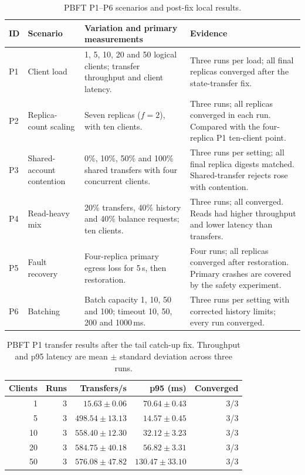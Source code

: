 \documentclass[sigconf,a4paper]{acmart}
\begin{document}
    \begin{table}[t]
        \centering
        \small
        \caption{PBFT P1--P6 scenarios and post-fix local results.}
        \label{tab:pbft-p-scenarios}
        \begin{tabular}{p{0.8cm}p{3.3cm}p{8.4cm}p{3.1cm}}
            \toprule
            \textbf{ID} & \textbf{Scenario} & \textbf{Variation and primary measurements} & \textbf{Evidence} \\
            \midrule
            P1 & Client load & 1, 5, 10, 20 and 50 logical clients; transfer throughput and client latency. & Three runs per load; all final replicas converged after the state-transfer fix. \\
            P2 & Replica-count scaling & Seven replicas ($f=2$), with ten clients. & Three runs; all replicas converged in each run. Compared with the four-replica P1 ten-client point. \\
            P3 & Shared-account contention & 0\%, 10\%, 50\% and 100\% shared transfers with four concurrent clients. & Three runs per setting; all final replica digests matched. Shared-transfer rejects rose with contention. \\
            P4 & Read-heavy mix & 20\% transfers, 40\% history and 40\% balance requests; ten clients. & Three runs; all converged. Reads had higher throughput and lower latency than transfers. \\
            P5 & Fault recovery & Four-replica primary egress loss for 5\,s, then restoration. & Four runs; all replicas converged after restoration. Primary crashes are covered by the safety experiment. \\
            P6 & Batching & Batch capacity 1, 10, 50 and 100; timeout 10, 50, 200 and 1000\,ms. & Three runs per setting with corrected history limits; every run converged. \\
            \bottomrule
        \end{tabular}
    \end{table}

    \begin{table}[t]
        \centering
        \small
        \caption{PBFT P1 transfer results after the tail catch-up fix. Throughput and p95 latency are mean $\pm$ standard deviation across three runs.}
        \label{tab:pbft-p1-load}
        \begin{tabular}{r r r r r}
            \toprule
            \textbf{Clients} & \textbf{Runs} & \textbf{Transfers/s} & \textbf{p95 (ms)} & \textbf{Converged} \\
            \midrule
            1  & 3 & $15.63 \pm 0.06$ & $70.64 \pm 0.43$ & 3/3 \\
            5  & 3 & $498.54 \pm 13.13$ & $14.57 \pm 0.45$ & 3/3 \\
            10 & 3 & $558.40 \pm 12.30$ & $32.12 \pm 3.23$ & 3/3 \\
            20 & 3 & $584.75 \pm 40.18$ & $56.82 \pm 3.31$ & 3/3 \\
            50 & 3 & $576.08 \pm 47.82$ & $130.47 \pm 33.10$ & 3/3 \\
            \bottomrule
        \end{tabular}
    \end{table}
\end{document}
